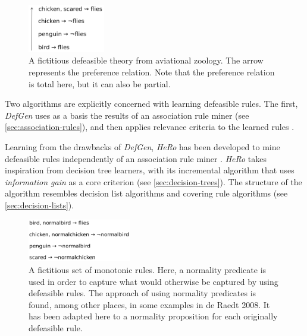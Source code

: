 \label{sec:defeasible-rules}

\begin{figure}[htb]
        \centering
        \includegraphics[width=0.3\textwidth]{images/defeasible-theory.png}
        \caption{A fictitious defeasible theory from aviational zoology. The arrow represents the preference relation. Note that the preference relation is total here, but it can also be partial.}
        \label{fig:defeasible-rules}
\end{figure}

Two algorithms are explicitly concerned with learning defeasible rules. The first, \textit{DefGen} uses as a basis the results of an association rule miner (see \autoref{sec:association-rules}), and then applies relevance criteria to the learned rules \cite{governatoriApplicationAssociationRules2001}.

Learning from the drawbacks of \textit{DefGen}, \textit{HeRo} has been developed to mine defeasible rules independently of an association rule miner \cite{johnstonAlgorithmInductionDefeasible2003}. \textit{HeRo} takes inspiration from decision tree learners, with its incremental algorithm that uses \textit{information gain} as a core criterion (see \autoref{sec:decision-trees}). The structure of the algorithm resembles decision list algorithms and covering rule algorithms (see \autoref{sec:decision-lists}).


\begin{figure}[htb]
        \centering
        \includegraphics[width=0.4\textwidth]{images/monotonic-theory.png}
        \caption{A fictitious set of monotonic rules. Here, a normality predicate is used in order to capture what would otherwise be captured by using defeasible rules. The approach of using normality predicates is found, among other places, in some examples in de Raedt 2008. It has been adapted here to a normality proposition for each originally defeasible rule.}
        \label{fig:relational}
\end{figure}

